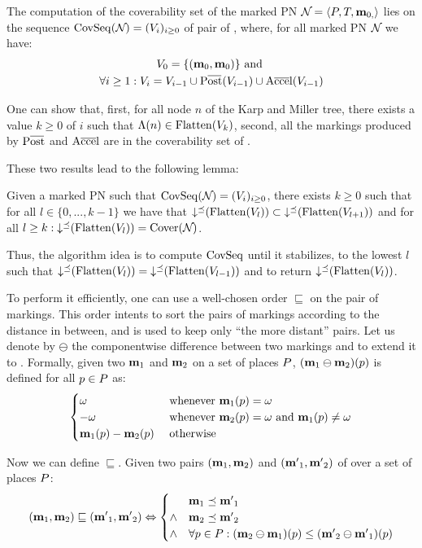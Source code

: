 The computation of the coverability set of the marked \ac{PN} $\mathcal{N}_{} = \left\langle P_{}, T_{}, \mathbf{m}_{0,}\right\rangle$ lies on the sequence $\operatorname{CovSeq}(\mathcal{N}_{}) = (V_i)_{i \geq 0}$ of pair of \omarks, where, for all marked \ac{PN} $\mathcal{N}_{}$ we have:
\begin{gather*}
  V_0 = \{(\mari, \mari)\} \text{ and } \\
  \forall i \geq 1 : V_i = V_{i-1} \cup \Postb(V_{i-1}) \cup \Accelb(V_{i-1})
\end{gather*}

One can show that,
first, for all node $n$ of the Karp and Miller tree, there exists a value $k \geq 0$ of $i$ such that $\operatorname{\Lambda}(n) \in \operatorname{Flatten}(V_k)$,
second, all the markings produced by $\Postb$ and $\operatorname{A\overline{cce}l}$ are in the coverability set of \namePN.

These two results lead to the following lemma:
\begin{lemm}
  Given a marked \ac{PN} \namePN such that $\operatorname{CovSeq}(\mathcal{N}_{}) = (V_i)_{i \geq 0}$,
  there exists $k \geq 0$ such that for all $l \in \{0, ..., k-1\}$ we have that $\operatorname{\downarrow^\preceq}(\operatorname{Flatten}(V_l)) \subset \operatorname{\downarrow^\preceq}(\operatorname{Flatten}(V_{l+1}))$
  and for all $l \geq k : \operatorname{\downarrow^\preceq}(\operatorname{Flatten}(V_l)) = \operatorname{Cover}(\mathcal{N}_{})$.
\end{lemm}

Thus, the algorithm idea is to compute $\operatorname{CovSeq}$ until it stabilizes,  to the lowest $l$ such that $\operatorname{\downarrow^\preceq}(\operatorname{Flatten}(V_l)) = \operatorname{\downarrow^\preceq}(\operatorname{Flatten}(V_{l-1}))$ and to return $\operatorname{\downarrow^\preceq}(\operatorname{Flatten}(V_l))$.

To perform it efficiently, one can use a well-chosen order $\sqsubseteq$ on the pair of markings.
This order intents to sort the pairs of markings according to the distance in between, and is used to keep only ``the more distant'' pairs.
Let us denote by $\ominus$ the componentwise difference between two markings and to extend it to \omarks.
Formally, given two \omarks $\mathbf{m}_1$ and $\mathbf{m}_2$ on a set of places $P$, $(\mathbf{m}_1 \ominus \mathbf{m}_2)(p)$ is defined for all $p \in P$ as:
\[
  \begin{cases}
    \omega & \text{ whenever } \mathbf{m}_1(p) = \omega \\
    -\omega & \text{ whenever } \mathbf{m}_2(p) = \omega \text{ and } \mathbf{m}_1(p) \neq \omega \\
    \mathbf{m}_1(p) - \mathbf{m}_2(p) & \text{ otherwise}
  \end{cases}
\]

Now we can define $\sqsubseteq$.
Given two pairs $(\mathbf{m}_1, \mathbf{m}_2)$ and $(\mathbf{m'}_1, \mathbf{m'}_2)$ of \omarks over a set of places $P$:
\[
  (\mathbf{m}_1, \mathbf{m}_2) \sqsubseteq (\mathbf{m'}_1, \mathbf{m'}_2) \Leftrightarrow
  \begin{cases}
    & \mathbf{m}_1 \preceq \mathbf{m'}_1 \\
    \wedge & \mathbf{m}_2 \preceq \mathbf{m'}_2 \\
    \wedge & \forall p \in P : (\mathbf{m}_2 \ominus \mathbf{m}_1)(p) \leq (\mathbf{m'}_2 \ominus \mathbf{m'}_1)(p)
  \end{cases}
\]

